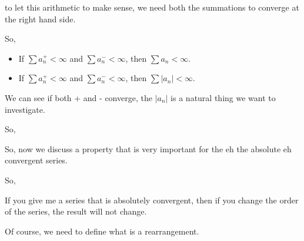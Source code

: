 \documentclass[11pt, sakura, night, 1in]{hw}
\begin{document}
to let this arithmetic to make sense, we need both the summations to converge at the right hand side.

So, 
\begin{itemize}
    \item If $\sum a_n^+<\infty$ and $\sum a_n^- < \infty$, then $\sum a_n < \infty$.
    \item If $\sum a_n^+<\infty$ and $\sum a_n^- < \infty$, then  $\sum |a_n | <\infty$. 
\end{itemize}

We can see if both + and - converge, the $|a_n|$ is a natural thing we want to investigate.


So,



So, now we discuss a property that is very important for the eh the absolute eh convergent series.

So,


If you give me a series that is absolutely convergent, then if you change the order of the series, the result will not change.

Of course, we need to define what is a rearrangement.
\end{document}
